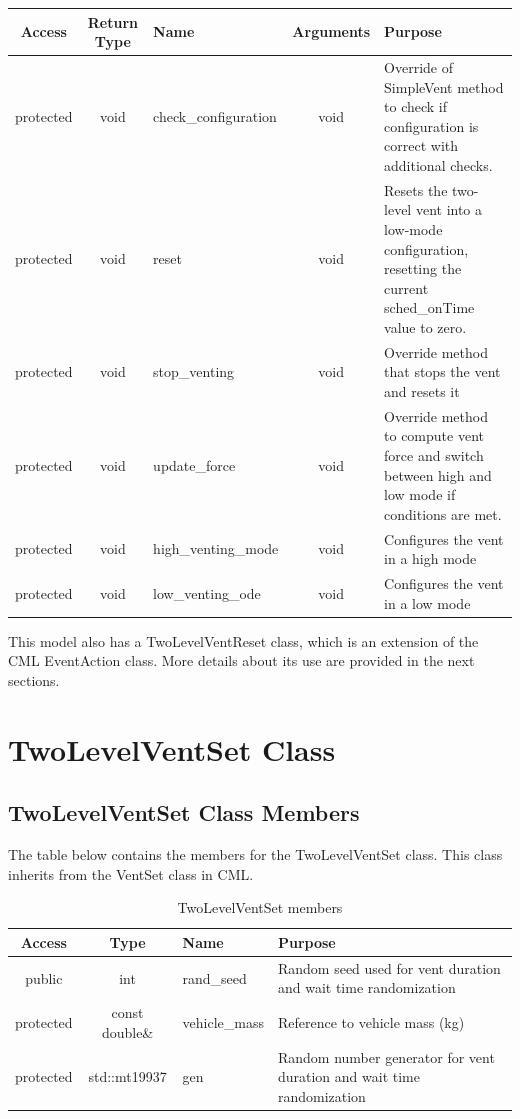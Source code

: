 \documentclass[11pt,fleqn]{report}
\begin{document}
\begin{table}[!h]
    \begin{tabularx}{\textwidth}{|c|c|X|c|X|} \hline
    \textbf{Access} & \textbf{Return Type} & \textbf{Name} & \textbf{Arguments} & \textbf{Purpose} \\
    \hline
    protected & void & check\_configuration & void & Override of SimpleVent method to check if configuration is correct with additional checks.  \\
    \hline
    protected & void & reset & void & Resets the two-level vent into a low-mode configuration, resetting the current sched\_onTime value to zero. \\
    \hline
    protected & void & stop\_venting & void & Override method that stops the vent and resets it  \\
    \hline
    protected & void & update\_force & void & Override method to compute vent force and switch between high and low mode if conditions are met.  \\
    \hline
    protected & void & high\_venting\_mode & void & Configures the vent in a high mode  \\
    \hline
    protected & void & low\_venting\_ode & void & Configures the vent in a low mode  \\
    \hline
    \end{tabularx}
\end{table}

This model also has a TwoLevelVentReset class, which is an extension of the CML EventAction class. 
More details about its use are provided in the next sections.

\section{TwoLevelVentSet Class}
\subsection{TwoLevelVentSet Class Members}
\noindent The table below contains the members for the TwoLevelVentSet class.  This class inherits from the VentSet class in CML.

\begin{table}[!h]
    \caption{TwoLevelVentSet members}
    \begin{tabularx}{\textwidth}{|c|c|X|X|} \hline
    \textbf{Access} & \textbf{Type} & \textbf{Name} & \textbf{Purpose} \\
    \hline
    public & int & rand\_seed & Random seed used for vent duration and wait time randomization \\
    \hline
    protected & const double\& & vehicle\_mass & Reference to vehicle mass (kg) \\
    \hline
    protected & std::mt19937 & gen & Random number generator for vent duration and wait time randomization \\
    \hline
    \end{tabularx}
\end{table}
\end{document}

